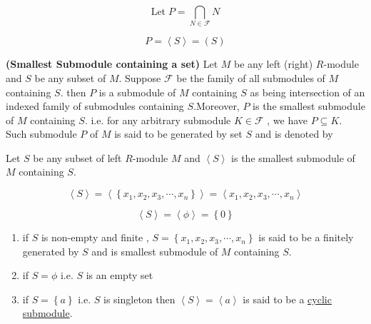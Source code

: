 \[
 \text{Let} \; P=\bigcap_{N \in \mathcal{F}}N  
\]

\[
P = \left\langle S \right\rangle  = (S) 
\]

\begin{remark}
\textbf{(Smallest Submodule containing a set)} \newline
	  		Let $M$ be any left (right) $R$-module and $S$ be any subset of $M$. Suppose $\mathcal{F}$ be the family of all submodules of $M$ containing $S$.  then $P$ is a submodule of $M$ containing $S$ as being intersection of an indexed family of submodules containing $S$.\newline \bigskip Moreover, $P$ is the smallest submodule of $M$ containing $S$. i.e. for any arbitrary submodule $K \in \mathcal{F}$ , we have $ P \subseteq K$. Such submodule $P$ of $M$ is said to be generated by set $S$ and is denoted by 

\end{remark}
\bigskip

\begin{remark}
\qquad

\begin{description}
	\item Let $S$ be any subset of left $R$-module $M$ and $\left\langle S \right\rangle $ is the smallest submodule of $M$ containing $S$.\newline

\[
\left\langle S \right\rangle = \left\langle \left\lbrace x_1,x_2,x_3, \cdots , x_n \right\rbrace \right\rangle  = \left\langle x_1,x_2,x_3, \cdots , x_n \right\rangle 
\]

\[
\left\langle S \right\rangle = \left\langle \phi \right\rangle = \left\lbrace 0 \right\rbrace 
\]

\begin{enumerate}
		\item if $S$ is non-empty and finite , $S = \left\lbrace x_1,x_2,x_3, \cdots , x_n \right\rbrace $  is said to be a finitely generated by $S$ and is smallest submodule of $M$ containing $S$.
		\item if $S = \phi$ \quad i.e. $S$ is an empty set 
		\item if $S = \left\lbrace a\right\rbrace $ \quad i.e. $S $ is singleton then $\left\langle S \right\rangle = \left\langle a\right\rangle $ is said to be a \underline{cyclic submodule}.
	
\end{enumerate}

\end{description}

\end{remark}
\bigskip


